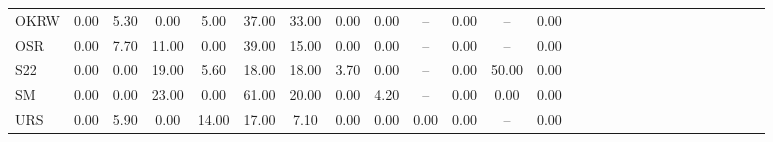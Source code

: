 \documentclass[12pt, oneside, titlepage]{article}   	%
\begin{document}
\begin{tabular*}{\textwidth}{ l @{\extracolsep{\fill}} *{26}{c} }
  OKRW & 0.00 & 5.30 & 0.00 & 5.00 & 37.00 & 33.00 & 0.00 & 0.00 & -- & 0.00 & -- & 0.00 \\ 
  OSR & 0.00 & 7.70 & 11.00 & 0.00 & 39.00 & 15.00 & 0.00 & 0.00 & -- & 0.00 & -- & 0.00 \\ 
  S22 & 0.00 & 0.00 & 19.00 & 5.60 & 18.00 & 18.00 & 3.70 & 0.00 & -- & 0.00 & 50.00 & 0.00 \\ 
  SM & 0.00 & 0.00 & 23.00 & 0.00 & 61.00 & 20.00 & 0.00 & 4.20 & -- & 0.00 & 0.00 & 0.00 \\ 
  URS & 0.00 & 5.90 & 0.00 & 14.00 & 17.00 & 7.10 & 0.00 & 0.00 & 0.00 & 0.00 & -- & 0.00 \\ 
      \hline
\end{tabular*}

\clearpage

\normalsize

 \setlength\tabcolsep{6pt} 

\iffalse
 
  \begin{figure}[h]
   \centering
       \texttt{[image: /Users/gregor/Dropbox/clarkiaSeedBanks/products/figures/underCounting.pdf]}  
    \caption{ Graphical summary of undercounting in the dataset on seedling survival to fruiting. Each panel summarizes the datasets on seedling survival to fruiting (Tables~\ref{tab:sigma} and~\ref{tab:undercount}). The black lines correspond to total plots with data on seedling survival. The red lines correspond to the number of plots with fewer seedlings than fruiting plants in a plot (corresponding to undercounting). }
 \label{fig:obs_pred}
\end{figure}

\fi
 
   \clearpage
   
  
\end{document}
